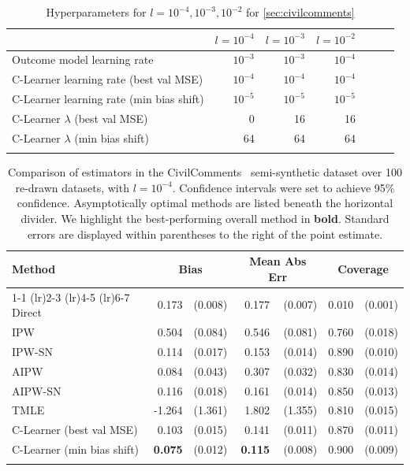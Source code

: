 \begin{table}[H]
\centering
\footnotesize
\begin{tabular}{lrrrrrr}
\toprule
 & $l=10^{-4}$ & $l=10^{-3}$ & $l=10^{-2}$ \\
 \midrule 
Outcome model learning rate & $10^{-3}$ & $10^{-3}$ & $10^{-4}$ \\
C-Learner learning rate (best val MSE) & $10^{-4}$ & $10^{-4}$ & $10^{-4}$ \\ 
C-Learner learning rate (min bias shift) & $10^{-5}$ & $10^{-5}$ & $10^{-5}$ \\ 
C-Learner $\lambda$ (best val MSE) & 0 & 16 & 16 \\
C-Learner $\lambda$ (min bias shift) & 64 & 64 & 64 \\
\bottomrule
\vspace{0.05em}
\end{tabular}
\caption{Hyperparameters for $l=10^{-4},10^{-3},10^{-2}$ for \cref{sec:civilcomments}}
    \label{tab:cc_hparams}
\end{table}

\begin{table}[H]
\centering
\footnotesize
\begin{tabular}{lrrrrrr}
\toprule
Method & \multicolumn{2}{c}{Bias} & \multicolumn{2}{c}{Mean Abs Err} & \multicolumn{2}{c}{Coverage}\\ 
\cmidrule(lr){1-1}
\cmidrule(lr){2-3}
\cmidrule(lr){4-5}
\cmidrule(lr){6-7}
Direct & 0.173 & (0.008) & 0.177 & (0.007) & 0.010 & (0.001)\\
IPW & 0.504 & (0.084) & 0.546 & (0.081) & 0.760 & (0.018)\\
IPW-SN & 0.114 & (0.017) & 0.153 & (0.014) & 0.890 & (0.010)\\
\greymidrule
AIPW & 0.084 & (0.043) & 0.307 & (0.032) & 0.830 & (0.014)\\
AIPW-SN & 0.116 & (0.018) & 0.161 & (0.014) & 0.850 & (0.013)\\
TMLE & -1.264 & (1.361) & 1.802 & (1.355) & 0.810 & (0.015)\\
C-Learner (best val MSE) & 0.103 & (0.015) & 0.141 & (0.011) & 0.870 & (0.011)\\
C-Learner (min bias shift) & \textbf{0.075} & (0.012) & \textbf{0.115} & (0.008) & 0.900 & (0.009)\\
\bottomrule
\vspace{0.05em}
\end{tabular}
\caption{Comparison of estimators in the CivilComments~\citep{civilcomments} semi-synthetic dataset over 100 re-drawn datasets, with $l=10^{-4}$. Confidence intervals were set to achieve 95\% confidence. Asymptotically optimal methods are listed beneath the horizontal divider. We highlight the best-performing overall method in \textbf{bold}. Standard errors are displayed within parentheses to the right of the point estimate.}
    \label{tab:nn_4}
\end{table}


